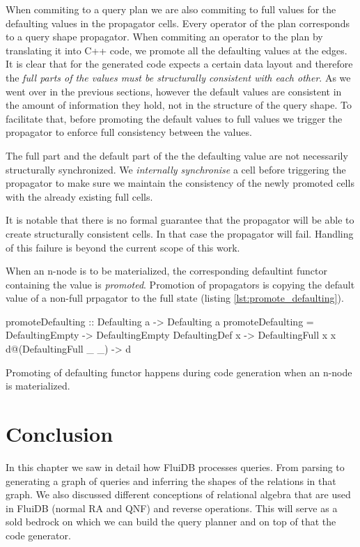 When commiting to a query plan we are also commiting to full values
for the defaulting values in the propagator cells. Every operator of
the plan corresponds to a query shape propagator. When commiting an
operator to the plan by translating it into C++ code, we promote all
the defaulting values at the edges. It is clear that for the generated
code expects a certain data layout and therefore the \emph{full parts
  of the values must be structurally consistent with each other}. As
we went over in the previous sections, however the default values are
consistent in the amount of information they hold, not in the
structure of the query shape. To facilitate that, before promoting the
default values to full values we trigger the propagator to enforce
full consistency between the values.

The full part and the default part of the the defaulting value are not
necessarily structurally synchronized. We \emph{internally synchronise} a
cell before triggering the propagator to make sure we maintain the
consistency of the newly promoted cells with the already existing full
cells.

It is notable that there is no formal guarantee that the propagator
will be able to create structurally consistent cells. In that case the
propagator will fail. Handling of this failure is beyond the current
scope of this work.

When an n-node is to be materialized, the corresponding defaultint
functor containing the value is \emph{promoted}.  Promotion of propagators
is copying the default value of a non-full prpagator to the full
state (listing \ref{lst:promote_defaulting}).


\begin{code}
  \begin{haskellcode}
    promoteDefaulting :: Defaulting a -> Defaulting a
    promoteDefaulting = \case
      DefaultingEmpty        -> DefaultingEmpty
      DefaultingDef x        -> DefaultingFull x x
      d@(DefaultingFull _ _) -> d
  \end{haskellcode}
  \label{lst:promote_defaulting}
  \caption{Promoting of defaulting functor happens
    during code generation when an n-node is materialized.}
\end{code}

\section{Conclusion}

In this chapter we saw in detail how FluiDB processes queries. From
parsing to generating a graph of queries and inferring the shapes of
the relations in that graph. We also discussed different conceptions
of relational algebra that are used in FluiDB (normal RA and QNF) and
reverse operations. This will serve as a sold bedrock on which we can
build the query planner and on top of that the code generator.

